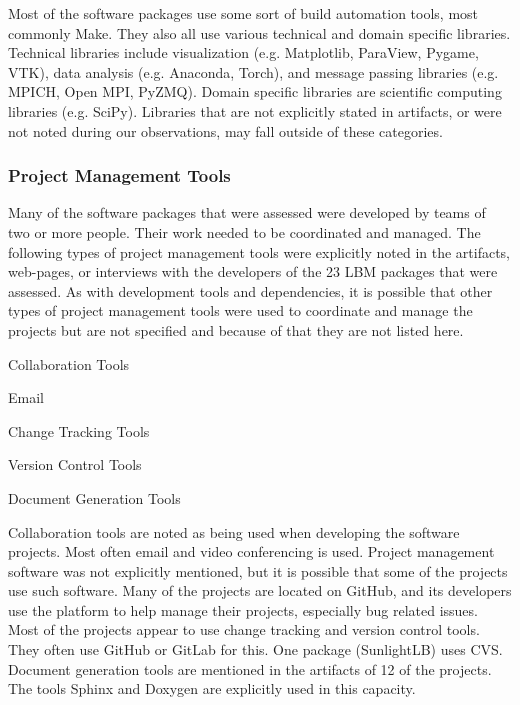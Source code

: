 \documentclass[12pt, notitlepage]{article}
\begin{document}
Most of the software packages use some sort of build automation tools, most commonly Make. They also all use various technical and domain specific libraries. Technical libraries include visualization (e.g. Matplotlib, ParaView, Pygame, VTK), data analysis (e.g. Anaconda, Torch), and message passing libraries (e.g. MPICH, Open MPI, PyZMQ). Domain specific libraries are scientific computing libraries (e.g. SciPy). Libraries that are not explicitly stated in artifacts, or were not noted during our observations, may fall outside of these categories. 

\subsubsection{Project Management Tools}

Many of the software packages that were assessed were developed by teams of two or more people. Their work needed to be coordinated and managed. The following types of project management tools were explicitly noted in the artifacts, web-pages, or interviews with the developers of the 23 LBM packages that were assessed. As with development tools and dependencies, it is possible that other types of project management tools were used to coordinate and manage the projects but are not specified and because of that they are not listed here.

	\begin{multicols}{2}	
		\begin{itemize}
		\end{itemize}
	\end{multicols}


Collaboration tools are noted as being used when developing the software projects. Most often email and video conferencing is used. Project management software was not explicitly mentioned, but it is possible that some of the projects use such software. Many of the projects are located on GitHub, and its developers use the platform to help manage their projects, especially bug related issues. Most of the projects appear to use change tracking and version control tools. They often use GitHub or GitLab for this. One package (SunlightLB) uses CVS. Document generation tools are mentioned in the artifacts of 12 of the projects. The tools Sphinx and Doxygen are explicitly used in this capacity. 
\end{document}
